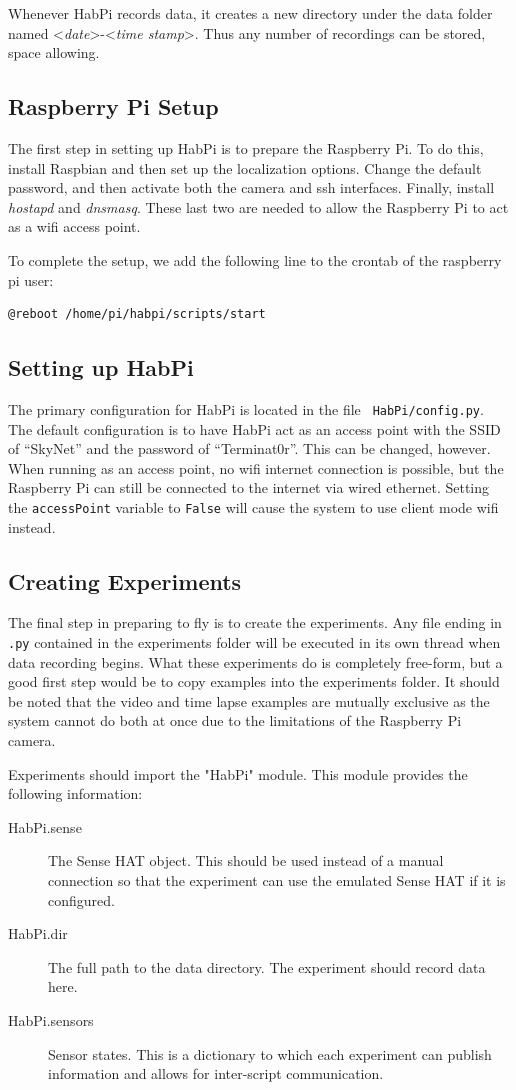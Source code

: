 \documentclass[journal]{new-aiaa}
\begin{document}
Whenever HabPi records data, it creates a new directory under the
data folder named <{\em date}>-<{\em time stamp}>.  Thus any number of
recordings can be stored, space allowing.

\subsection{Raspberry Pi Setup}
The first step in setting up HabPi is to prepare the Raspberry Pi.
To do this, install Raspbian and then set up the localization options.
Change the default password, and then activate both the camera and ssh
interfaces.  Finally, install {\em hostapd} and {\em dnsmasq}.  These
last two are needed to allow the Raspberry Pi to act as a wifi access
point.

To complete the setup, we add the following line to the crontab of the
raspberry pi user:
\begin{verbatim}
@reboot /home/pi/habpi/scripts/start
\end{verbatim}

\subsection{Setting up HabPi}
The primary configuration for HabPi is located in the file {\tt
HabPi/config.py}.  The default configuration is to have HabPi act as
an access point with the SSID of ``SkyNet'' and the password of
``Terminat0r''. This can be changed, however.  When running as an
access point, no wifi internet connection is possible, but the Raspberry
Pi can still be connected to the internet via wired ethernet.
Setting the {\tt accessPoint} variable to {\tt False} will cause the
system to use client mode wifi instead.  

\subsection{Creating Experiments}
The final step in preparing to fly is to create the experiments.  Any
file ending in {\tt.py} contained in the experiments folder will be
executed in its own thread when data recording begins.  What these
experiments do is completely free-form, but a good first step would be to
copy examples into the experiments folder.  It should be noted that
the video and time lapse examples are mutually exclusive as the system
cannot do both at once due to the limitations of the Raspberry Pi
camera.

Experiments should import the "HabPi" module.
This module provides the following information:
\begin{description}
    \item[HabPi.sense] The Sense HAT object.  This should be used
    instead of a manual connection so that the experiment can use the
    emulated Sense HAT if it is configured.
    \item[HabPi.dir] The full path to the data directory.  The
    experiment should record data here.
    \item[HabPi.sensors] Sensor states.  This is a dictionary to which
    each experiment can publish information and allows for
    inter-script communication.
\end{description}
\end{document}
